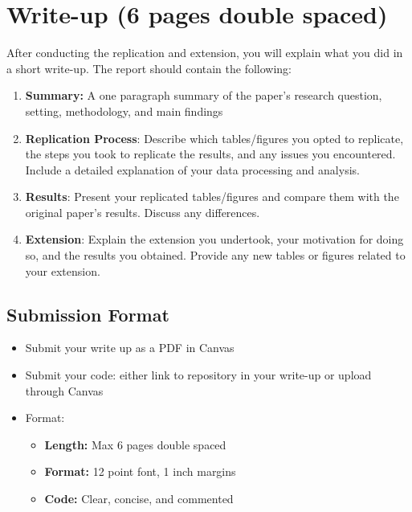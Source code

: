 \documentclass[
]{article}
\providecommand{\tightlist}{%
  \setlength{\itemsep}{0pt}\setlength{\parskip}{0pt}}
\begin{document}
\hypertarget{write-up-6-pages-double-spaced}{%
\section{Write-up (6 pages double spaced)}\label{write-up-6-pages-double-spaced}}

After conducting the replication and extension, you will explain what you did in a short write-up. The report should contain the following:

\begin{enumerate}
\def\labelenumi{\arabic{enumi}.}
\tightlist
\item
  \textbf{Summary:} A one paragraph summary of the paper's research question, setting, methodology, and main findings
\item
  \textbf{Replication Process}: Describe which tables/figures you opted to replicate, the steps you took to replicate the results, and any issues you encountered. Include a detailed explanation of your data processing and analysis.
\item
  \textbf{Results}: Present your replicated tables/figures and compare them with the original paper's results. Discuss any differences.
\item
  \textbf{Extension}: Explain the extension you undertook, your motivation for doing so, and the results you obtained. Provide any new tables or figures related to your extension.
\end{enumerate}

\hypertarget{submission-format}{%
\subsection{Submission Format}\label{submission-format}}

\begin{itemize}
\tightlist
\item
  Submit your write up as a PDF in Canvas
\item
  Submit your code: either link to repository in your write-up or upload through Canvas
\item
  Format:

  \begin{itemize}
  \tightlist
  \item
    \textbf{Length:} Max 6 pages double spaced
  \item
    \textbf{Format:} 12 point font, 1 inch margins
  \item
    \textbf{Code:} Clear, concise, and commented
  \end{itemize}
\end{itemize}
\end{document}

